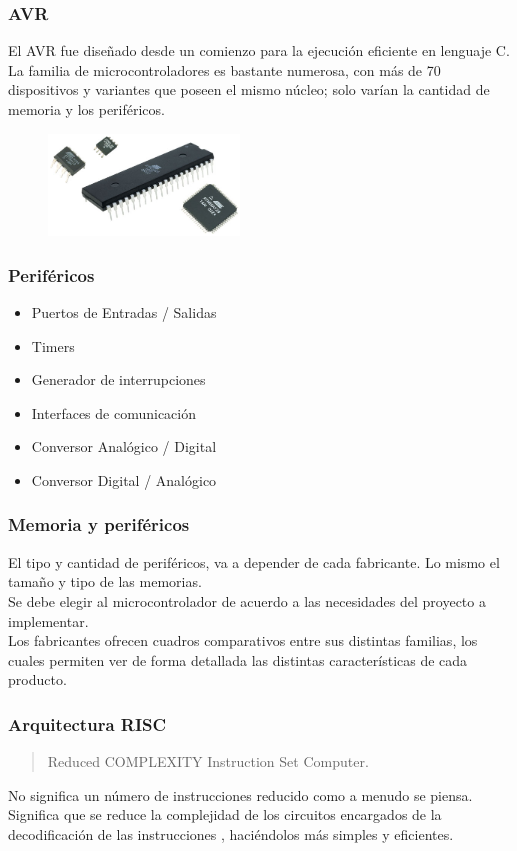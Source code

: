 \documentclass{beamer}
\begin{document}
\begin{frame}
\frametitle{AVR}
El AVR fue diseñado desde un comienzo para la ejecución eficiente en lenguaje C.\\

La familia de microcontroladores es bastante numerosa, con más de 70 dispositivos y variantes que poseen el mismo núcleo; solo varían la cantidad de memoria y los periféricos.
\begin{figure}[!h]
\centering
\includegraphics[width=2in]{micros}
\end{figure}
\end{frame}

\begin{frame}
\frametitle{Periféricos}
\begin{itemize}
\item Puertos de Entradas / Salidas
\item Timers
\item Generador de interrupciones
\item Interfaces de comunicación
\item Conversor Analógico / Digital
\item Conversor Digital / Analógico
\end{itemize}
\end{frame}

\begin{frame}
\frametitle{Memoria y periféricos}
El tipo y cantidad de periféricos, va a depender de cada fabricante. Lo mismo el tamaño y tipo de las memorias.\\

Se debe elegir al microcontrolador de acuerdo a las necesidades del proyecto a implementar.\\

Los fabricantes ofrecen cuadros comparativos entre sus distintas familias,  los cuales permiten ver de forma detallada las distintas características de cada producto.
\end{frame}

\begin{frame}
\frametitle{Arquitectura RISC}
\begin{quotation}
Reduced COMPLEXITY Instruction Set Computer.
\end{quotation}
No significa un número de instrucciones reducido como a menudo se piensa. Significa que se reduce la complejidad de los circuitos encargados de la decodificación de las instrucciones , haciéndolos más simples y eficientes. 
\end{frame}
\end{document}
